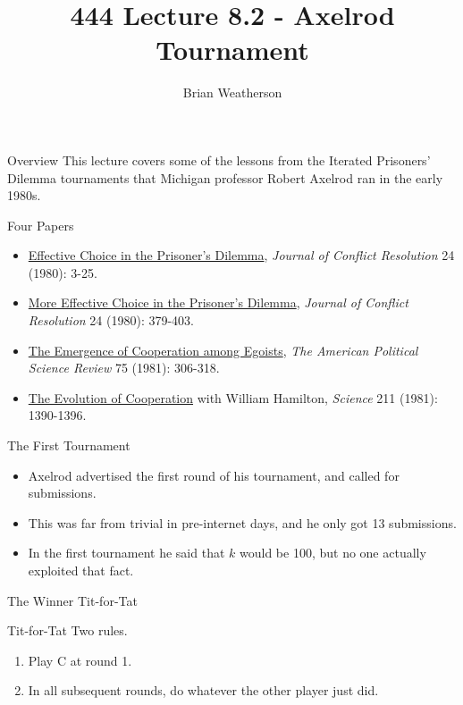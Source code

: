 \documentclass[
  ignorenonframetext,
]{beamer}
\title{444 Lecture 8.2 - Axelrod Tournament}
\author{Brian Weatherson}
\date{}
\providecommand{\tightlist}{%
  \setlength{\itemsep}{0pt}\setlength{\parskip}{0pt}}
\begin{document}
\frame{\titlepage}

\begin{frame}{Overview}
\protect\hypertarget{overview}{}
This lecture covers some of the lessons from the Iterated Prisoners'
Dilemma tournaments that Michigan professor Robert Axelrod ran in the
early 1980s.
\end{frame}

\begin{frame}{Four Papers}
\protect\hypertarget{four-papers}{}
\begin{itemize}
\tightlist
\item
  \href{https://www.jstor.org/stable/173932}{Effective Choice in the
  Prisoner's Dilemma}, \emph{Journal of Conflict Resolution} 24 (1980):
  3-25.
\item
  \href{https://www.jstor.org/stable/173638}{More Effective Choice in
  the Prisoner's Dilemma}, \emph{Journal of Conflict Resolution} 24
  (1980): 379-403.
\item
  \href{https://www.jstor.org/stable/1961366}{The Emergence of
  Cooperation among Egoists}, \emph{The American Political Science
  Review} 75 (1981): 306-318.
\item
  \href{https://www.jstor.org/stable/1685895}{The Evolution of
  Cooperation} with William Hamilton, \emph{Science} 211 (1981):
  1390-1396.
\end{itemize}
\end{frame}

\begin{frame}{The First Tournament}
\protect\hypertarget{the-first-tournament}{}
\begin{itemize}
\tightlist
\item
  Axelrod advertised the first round of his tournament, and called for
  submissions.
\item
  This was far from trivial in pre-internet days, and he only got 13
  submissions.
\item
  In the first tournament he said that \(k\) would be 100, but no one
  actually exploited that fact.
\end{itemize}
\end{frame}

\begin{frame}{The Winner}
\protect\hypertarget{the-winner}{}
Tit-for-Tat
\end{frame}

\begin{frame}{Tit-for-Tat}
\protect\hypertarget{tit-for-tat}{}
Two rules.

\begin{enumerate}
\tightlist
\item
  Play C at round 1.
\item
  In all subsequent rounds, do whatever the other player just did.
\end{enumerate}
\end{frame}
\end{document}
